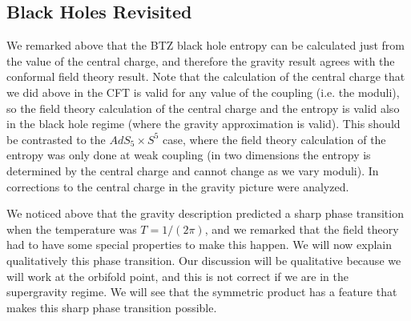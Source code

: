 \subsection{Black Holes Revisited}

We remarked above that the BTZ black hole entropy can be calculated 
just from the  value of the central charge, and therefore the 
gravity result agrees with the conformal field theory result. 
Note that the calculation of the central charge that we did 
above in the CFT is valid for any value of the coupling (i.e. the
moduli), so the field theory 
calculation of the central charge and the entropy
is valid also in the black hole regime (where the gravity
approximation is valid).
This  should be contrasted to the  
 $AdS_5 \times S^5$ case,  where the field theory calculation of the
entropy was only done at weak coupling (in two dimensions the entropy
is determined by the central charge and cannot change as we vary moduli). 
In \cite{Behrndt:1998nt} corrections to the central charge 
in the gravity picture
were analyzed. 

We noticed  above that the gravity description predicted a sharp 
phase transition when the temperature was $ T = 1/(2\pi) $,  and
we remarked that the field theory had to have some special properties
to make this happen.  
We will now explain qualitatively this phase transition.
Our discussion 
will be qualitative because we will work at the orbifold point, and
this is not correct 
if we are in the supergravity regime.  We  will see that
the symmetric product has a feature that makes this sharp 
phase transition possible.


